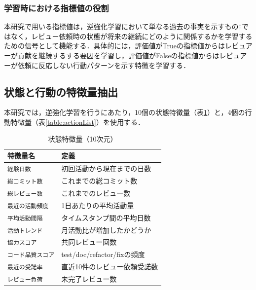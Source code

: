 \documentclass[submit,techrep,noauthor]{ipsj}
\begin{document}
\subsubsection{学習時における指標値の役割}
本研究で用いる指標値は，逆強化学習において単なる過去の事実を示すもの†ではなく，レビュー依頼時の状態が将来の継続にどのように関係するかを学習するための信号として機能する．具体的には，評価値がTrueの指標値からはレビュアーが貢献を継続するする要因を学習し，評価値がFalseの指標値からはレビュアーが依頼に反応しない行動パターンを示す特徴を学習する．


\subsection{状態と行動の特徴量抽出}
本研究では，逆強化学習を行うにあたり，10個の状態特徴量（表\ref{table:stateList}）と，4個の行動特徴量（表\ref{table:actionList}）を使用する．

\begin{table}[h]
    \centering
    \label{table:stateList}
    \caption{状態特徴量（10次元）}
    \begin{tabular}{@{}ll@{}}
        \toprule
        \textbf{特徴量名} & \textbf{定義} \\
        \midrule
        \texttt{経験日数} & 初回活動から現在までの日数 \\
        \texttt{総コミット数} & これまでの総コミット数 \\
        \texttt{総レビュー数} & これまでのレビュー数 \\
        \texttt{最近の活動頻度} & 1日あたりの平均活動量 \\
        \texttt{平均活動間隔} &  タイムスタンプ間の平均日数 \\
        \texttt{活動トレンド} & 月活動比が増加したかどうか \\
        \texttt{協力スコア} & 共同レビュー回数 \\ 
        \texttt{コード品質スコア} & test/doc/refactor/fixの頻度 \\
        \texttt{最近の受諾率} & 直近10件のレビュー依頼受諾数 \\
        \texttt{レビュー負荷} & 未完了レビュー数 \\
        \bottomrule
    \end{tabular}
\end{table}

\vspace{2mm}
\end{document}
